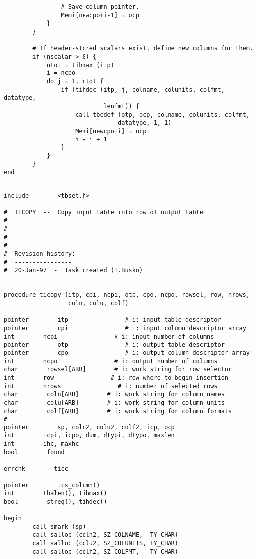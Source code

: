 \begin{verbatim}
                # Save column pointer.
                Memi[newcpo+i-1] = ocp
            }
        }

        # If header-stored scalars exist, define new columns for them.
        if (nscalar > 0) {
            ntot = tihmax (itp)
            i = ncpo
            do j = 1, ntot {
                if (tihdec (itp, j, colname, colunits, colfmt, datatype,
                            lenfmt)) {
                    call tbcdef (otp, ocp, colname, colunits, colfmt,
                                datatype, 1, 1)
                    Memi[newcpo+i] = ocp
                    i = i + 1
                }
            }
        }
end

\end{verbatim}
\newpage
{}
\begin{verbatim}

include        <tbset.h>

#  TICOPY  --  Copy input table into row of output table
#
#
#
#
#  Revision history:
#  ----------------
#  20-Jan-97  -  Task created (I.Busko)


procedure ticopy (itp, cpi, ncpi, otp, cpo, ncpo, rowsel, row, nrows,
                  coln, colu, colf)

pointer        itp                # i: input table descriptor
pointer        cpi                # i: input column descriptor array
int        ncpi                # i: input number of columns
pointer        otp                # i: output table descriptor
pointer        cpo                # i: output column descriptor array
int        ncpo                # i: output number of columns
char        rowsel[ARB]        # i: work string for row selector
int        row                # i: row where to begin insertion
int        nrows                # i: number of selected rows
char        coln[ARB]        # i: work string for column names
char        colu[ARB]        # i: work string for column units
char        colf[ARB]        # i: work string for column formats
#--
pointer        sp, coln2, colu2, colf2, icp, ocp
int        icpi, icpo, dum, dtypi, dtypo, maxlen
int        ihc, maxhc
bool        found

errchk        ticc

pointer        tcs_column()
int        tbalen(), tihmax()
bool        streq(), tihdec()

begin
        call smark (sp)
        call salloc (coln2, SZ_COLNAME,  TY_CHAR)
        call salloc (colu2, SZ_COLUNITS, TY_CHAR)
        call salloc (colf2, SZ_COLFMT,   TY_CHAR)


\end{verbatim}
